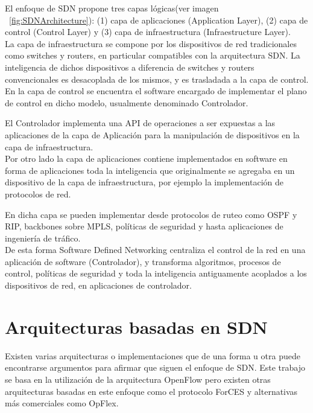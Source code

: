 El enfoque de SDN propone tres capas lógicas(ver imagen ~\ref{fig:SDNArchitecture}): (1) capa de aplicaciones (Application Layer), (2) capa de control (Control Layer) y (3) capa de infraestructura (Infraestructure Layer).\\

La capa de infraestructura se compone por los dispositivos de red tradicionales como switches y routers, en particular compatibles con la arquitectura SDN. La inteligencia de dichos dispositivos a diferencia de switches y routers convencionales es desacoplada de los mismos, y es trasladada a la capa de control.\\

En la capa de control se encuentra el software encargado de implementar el plano de control en dicho modelo, usualmente denominado Controlador.

El Controlador implementa una API de operaciones a ser expuestas a las aplicaciones de la capa de Aplicación para la manipulación de dispositivos en la capa de infraestructura.\\

Por otro lado la capa de aplicaciones contiene implementados en software en forma de aplicaciones toda la inteligencia que originalmente se agregaba en un dispositivo de la capa de infraestructura, por ejemplo la implementaci\'on de protocolos de red.

En dicha capa se pueden implementar desde protocolos de ruteo como OSPF y RIP, backbones sobre MPLS, políticas de seguridad y hasta aplicaciones de ingeniería de tráfico.\\

De esta forma Software Defined Networking centraliza el control de la red en una aplicación de software (Controlador), y transforma algoritmos, procesos de control, políticas de seguridad y toda la inteligencia antiguamente acoplados a los dispositivos de red, en aplicaciones de controlador.\\

\section{Arquitecturas basadas en SDN}
\label{section2.3}

Existen varias arquitecturas o implementaciones que de una forma u otra puede encontrarse argumentos para afirmar que siguen el enfoque de SDN. Este trabajo se basa en la utilización de la arquitectura OpenFlow pero existen otras arquitecturas basadas en este enfoque como el protocolo ForCES y alternativas m\'as comerciales como OpFlex.

